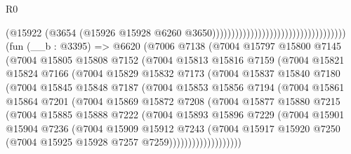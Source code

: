 \begin{lexlean}{R0}
\begin{coremodule}
                                                                    (@15922
                                                                      (@3654
                                                                        (@15926
                                                                          @15928
                                                                          @6260
                                                                          @3650)))))))))))))))))))))))))))))))))))
    (fun (__b : @3395) =>
    @6620
      (@7006
        @7138
        (@7004
          @15797
          @15800
          @7145
          (@7004
            @15805
            @15808
            @7152
            (@7004
              @15813
              @15816
              @7159
              (@7004
                @15821
                @15824
                @7166
                (@7004
                  @15829
                  @15832
                  @7173
                  (@7004
                    @15837
                    @15840
                    @7180
                    (@7004
                      @15845
                      @15848
                      @7187
                      (@7004
                        @15853
                        @15856
                        @7194
                        (@7004
                          @15861
                          @15864
                          @7201
                          (@7004
                            @15869
                            @15872
                            @7208
                            (@7004
                              @15877
                              @15880
                              @7215
                              (@7004
                                @15885
                                @15888
                                @7222
                                (@7004
                                  @15893
                                  @15896
                                  @7229
                                  (@7004
                                    @15901
                                    @15904
                                    @7236
                                    (@7004
                                      @15909
                                      @15912
                                      @7243
                                      (@7004
                                        @15917
                                        @15920
                                        @7250
                                        (@7004 @15925 @15928 @7257 @7259)))))))))))))))))))

\end{coremodule}
\end{lexlean}
